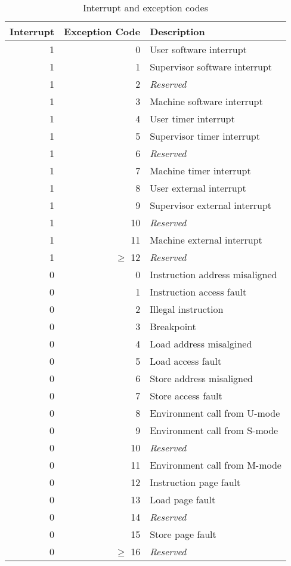 \begin{table}
    \centering
    \begin{tabular}{| r | r | l |}
        \hline
        Interrupt & Exception Code & Description \\
        \hline
        1 & 0 & User software interrupt \\
        1 & 1 & Supervisor software interrupt \\
        1 & 2 & \textit{Reserved} \\
        1 & 3 & Machine software interrupt \\
        \hline
        1 & 4 & User timer interrupt \\
        1 & 5 & Supervisor timer interrupt \\
        1 & 6 & \textit{Reserved} \\
        1 & 7 & Machine timer interrupt \\
        \hline
        1 & 8 & User external interrupt \\
        1 & 9 & Supervisor external interrupt \\
        1 & 10 & \textit{Reserved} \\
        1 & 11 & Machine external interrupt \\
        \hline
        1 & $ \geq $ 12 & \textit{Reserved} \\
        \hline
        0 & 0 & Instruction address misaligned \\
        0 & 1 & Instruction access fault \\
        0 & 2 & Illegal instruction \\
        0 & 3 & Breakpoint \\
        0 & 4 & Load address misalgined \\
        0 & 5 & Load access fault \\
        0 & 6 & Store \textelp{} address misaligned \\
        0 & 7 & Store \textelp{} access fault \\
        0 & 8 & Environment call from U-mode \\
        0 & 9 & Environment call from S-mode \\
        0 & 10 & \textit{Reserved} \\
        0 & 11 & Environment call from M-mode \\
        0 & 12 & Instruction page fault \\
        0 & 13 & Load page fault \\
        0 & 14 & \textit{Reserved} \\
        0 & 15 & Store \textelp{} page fault \\
        0 & $ \geq $ 16 & \textit{Reserved} \\
        \hline
    \end{tabular}
    \caption{Interrupt and exception codes \cite{RiscVISAP}}
    \label{tbl:interrupt-exception-codes}
\end{table}

